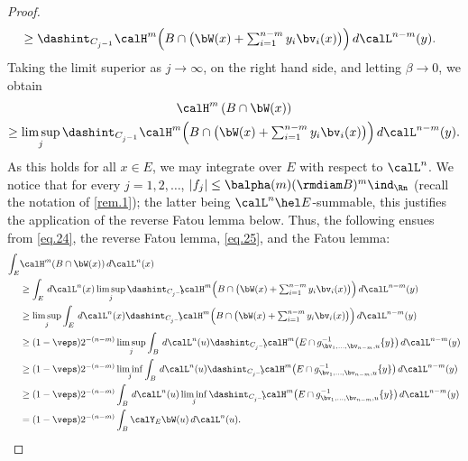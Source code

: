 \begin{proof}
\begin{equation*}
\begin{split}
& \geq \dashint_{C_{j^{-1}}}\textstyle\calH^m \Bigl(B \cap \bigl(\bW(x) + \sum_{i=1}^{n-m} y_i \bv_i(x) \bigr) \Bigr) \,d\calL^{n-m}(y).
\end{split}
\end{equation*}
Taking the limit superior as $j \to \infty$, on the right hand side, and letting $\beta \to 0$, we obtain
\begin{multline}
\label{eq.24}
\calH^m \left(B \cap \bW(x) \right)\\
\geq \limsup_j \dashint_{C_{j^{-1}}}\textstyle\calH^m \Bigl(B \cap \bigl(\bW(x) + \sum_{i=1}^{n-m} y_i \bv_i(x) \bigr) \Bigr) \,d\calL^{n-m}(y).
\end{multline}
As this holds for all $x \in E$, we may integrate over $E$ with respect to $\calL^n$.
We notice that for every $j=1,2,\ldots$, $|f_j| \leq \balpha(m) (\rmdiam B)^m \ind_{\Rn}$ (recall the notation of \ref{rem.1}); the latter being $\calL^n \hel E$-summable, this justifies the application of the reverse Fatou lemma below.
Thus, the following ensues from \eqref{eq.24}, the reverse Fatou lemma, \eqref{eq.25}, and the Fatou lemma:
\begin{align*}
\int_E &\calH^m(B \cap \bW(x)) \,d\calL^n(x) \\& \geq \int_E \,d\calL^n(x) \limsup_j \dashint_{C_{j^{-1}}}\hspace*{-2mm}\textstyle\calH^m \Bigl(B \cap \bigl(\bW(x) + \sum_{i=1}^{n-m} y_i \bv_i(x) \bigr) \Bigr) \,d\calL^{n-m}(y) \\
& \geq \limsup_j \int_E \,d\calL^n(x)\dashint_{C_{j^{-1}}}\hspace*{-2mm}\textstyle\calH^m \Bigl(B \cap \bigl(\bW(x) + \sum_{i=1}^{n-m} y_i \bv_i(x) \bigr) \Bigr) \,d\calL^{n-m}(y) \\
& \geq (1-\veps) 2^{-(n-m)} \limsup_j \int_B \,d\calL^n(u) \dashint_{C_{j^{-1}}} \hspace*{-2mm}\calH^m \bigl(E \cap g_{\bv_1,\ldots,\bv_{n-m},u}^{-1}\{y\} \bigr)\,d\calL^{n-m}(y)\\
& \geq (1-\veps) 2^{-(n-m)} \liminf_j \int_B \,d\calL^n(u) \dashint_{C_{j^{-1}}} \hspace*{-2mm}\calH^m \bigl(E \cap g_{\bv_1,\ldots,\bv_{n-m},u}^{-1}\{y\} \bigr)\,d\calL^{n-m}(y)\\
& \geq (1-\veps) 2^{-(n-m)} \int_B \,d\calL^n(u)\liminf_j \dashint_{C_{j^{-1}}} \hspace*{-2mm}\calH^m \bigl(E \cap g_{\bv_1,\ldots,\bv_{n-m},u}^{-1}\{y\} \bigr)\,d\calL^{n-m}(y)\\
&= (1-\veps) 2^{-(n-m)}\int_B \calY_E \bW(u)\,d\calL^n(u).\qedhere
\end{align*}
\end{proof}

